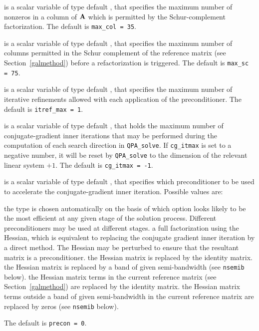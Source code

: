 \begin{description}
 is a scalar variable of type default \integer, that specifies
the maximum number of nonzeros in a column of ${\mathbf{A}}$ which is permitted
by the Schur-complement factorization.
The default is {\tt max\_col = 35}.

 is a scalar variable of type default \integer, that specifies
the maximum number of columns permitted in the Schur complement of the
reference matrix (see Section~\ref{galmethod})
before a refactorization is triggered.
The default is {\tt max\_sc = 75}.



 is a scalar variable of type default \integer, that specifies
the maximum number of iterative refinements allowed with each application
of the preconditioner.
The default is {\tt itref\_max = 1}.

 is a scalar variable of type default \integer, that holds the
maximum number of conjugate-gradient inner iterations that may be performed
during the computation of each search direction in {\tt QPA\_solve}.
If {\tt cg\_itmax} is set to a negative number, it will be reset by
{\tt QPA\_solve} to the dimension of the relevant linear system $+ 1$.
The default is {\tt cg\_itmax = -1}.

 is a scalar variable of type default \integer, that specifies
which preconditioner to be used to accelerate the conjugate-gradient
inner iteration.  Possible values are:

\begin{description}
 the type is chosen automatically on the basis of which option looks
        likely to be the most efficient at any given stage of the solution
        process. Different preconditioners may be used at different stages.
  a full factorization using the Hessian, which is equivalent to
        replacing the conjugate gradient inner iteration by a direct method.
        The Hessian may be perturbed to ensure that the resultant matrix
        is a preconditioner.
 the Hessian matrix is replaced by the identity matrix.
 the Hessian matrix is replaced by a band of given semi-bandwidth
        (see {\tt nsemib} below).
  the Hessian matrix terms in the current reference matrix
        (see Section~\ref{galmethod}) are replaced by the identity matrix.
  the Hessian matrix terms outside a band of given semi-bandwidth
        in the current reference matrix are replaced by zeros
        (see {\tt nsemib} below).
\end{description}
The default is {\tt precon = 0}.


\end{description}
